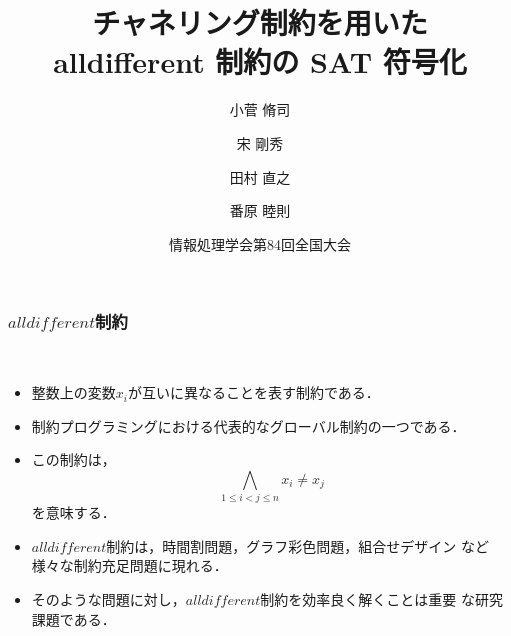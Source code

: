 \documentclass [dvipdfmx,11pt]{beamer}
\title{チャネリング制約を用いた\\ alldifferent 制約の SAT 符号化}
\author{小菅 脩司\inst{1} \and 宋 剛秀\inst{2} \and 田村 直之\inst{2} \and 番原 睦則\inst{1}}
\institute{ \inst{1}名古屋大学 \ \  \inst{2}神戸大学 }
\date{情報処理学会第84回全国大会}
\newcommand{\alldifferent}{$alldifferent$}
\begin{document}
\begin{frame} {}
    \titlepage
\end{frame}




\begin{frame}
    \frametitle{{\alldifferent}制約}
    \begin{alertblock}{}\centering
        \alert{}\\[1em]
        \begin{itemize}
            \item 整数上の変数$x_{i}$が互いに異なることを表す制約である．
            \item 制約プログラミングにおける代表的なグローバル制約の一つである．
        \end{itemize}
    \end{alertblock}
    \begin{itemize}
        \item この制約は，
            $$\bigwedge_{1 \leq i < j \leq n} x_i \neq x_j$$
            を意味する．
        \item {\alldifferent}制約は，時間割問題，グラフ彩色問題，組合せデザイン
            など様々な制約充足問題に現れる．
        \item そのような問題に対し，{\alldifferent}制約を効率良く解くことは重要
            な研究課題である．
    \end{itemize}
\end{frame}
\end{document}
